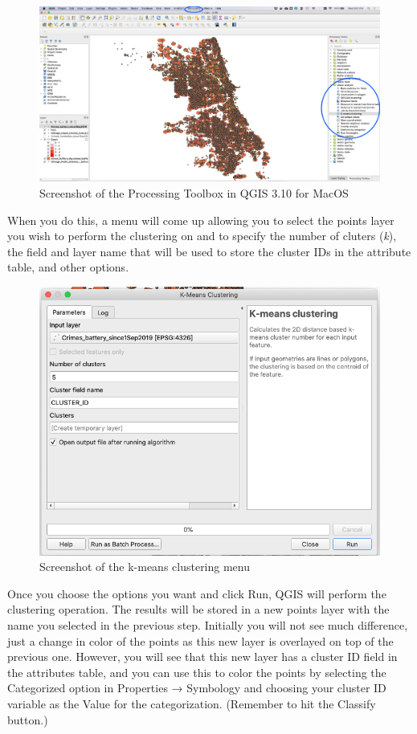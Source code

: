 \documentclass[]{book}
\begin{document}
\begin{figure}
\centering
\includegraphics{images/clustering_qgis1.png}
\caption{Screenshot of the Processing Toolbox in QGIS 3.10 for MacOS}
\end{figure}

When you do this, a menu will come up allowing you to select the points layer you wish to perform the clustering on and to specify the number of cluters (\emph{k}), the field and layer name that will be used to store the cluster IDs in the attribute table, and other options.

\begin{figure}
\centering
\includegraphics{images/clustering_qgis2.png}
\caption{Screenshot of the k-means clustering menu}
\end{figure}

Once you choose the options you want and click Run, QGIS will perform the clustering operation. The results will be stored in a new points layer with the name you selected in the previous step. Initially you will not see much difference, just a change in color of the points as this new layer is overlayed on top of the previous one. However, you will see that this new layer has a cluster ID field in the attributes table, and you can use this to color the points by selecting the Categorized option in Properties → Symbology and choosing your cluster ID variable as the Value for the categorization. (Remember to hit the Classify button.)
\end{document}
